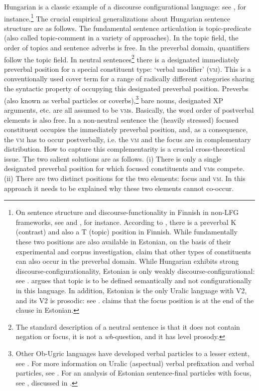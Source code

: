 \documentclass[output=paper,hidelinks]{langscibook}
\begin{document}
\newpage
Hungarian is a classic example of a discourse configurational language: see \citet{Kiss1995}, for instance.\footnote{On sentence structure and discourse-functionality in Finnish in non-LFG frameworks, see \citet{Vilkuna1995} and \citet{Brattico2019}, for instance. According to \citet{Vilkuna1995}, there is a preverbal K (contrast) and also a T (topic) position in Finnish. While fundamentally these two positions are also available in Estonian, on the basis of their experimental and corpus investigation, \citet{SahkaiTamm2018a,SahkaiTamm2019} claim that other types of constituents can also occur in the preverbal domain. While Hungarian exhibits strong discourse-configurationality, Estonian is only weakly discourse-configurational: see \citet[416--417]{SahkaiTamm2018a}. \citet{Hiietam2003} argues that topic is to be defined semantically and not configurationally in this language. In addition, Estonian is the only Uralic language with V2, and its V2 is prosodic: see \citet{SahkaiTamm2018b}. \citet{Tael1988} claims that the focus position is at the end of the clause in Estonian.} The crucial empirical generalizations about Hungarian sentence structure are as follows. The fundamental sentence articulation is topic-predicate (also called topic-comment in a variety of approaches). In the topic field, the order of topics and sentence adverbs is free. In the preverbal domain, quantifiers follow the topic field. In neutral sentences\footnote{The standard description of a neutral sentence is that it does not contain negation or focus, it is not a \textit{wh}-question, and it has level prosody.} there is a designated immediately preverbal position for a special constituent type: `verbal modifier' (\textsc{vm}). This is a conventionally used cover term for a range of radically different categories sharing the syntactic property of occupying this designated preverbal position. Preverbs (also known as verbal particles or coverbs),\footnote{Other Ob-Ugric languages have developed verbal particles to a lesser extent, see \citet{Zsirai1933}. For more information on Uralic (aspectual) verbal prefixation and verbal particles, see \citet{KieferHonti2003}. For an analysis of Estonian sentence-final particles with focus, see \citet[224--242]{Tamm2004a}, discussed in .} bare nouns, designated XP arguments, etc. are all assumed to be \textsc{vm}s. Basically, the word order of postverbal elements is also free. In a non-neutral sentence the (heavily stressed) focused constituent occupies the immediately preverbal position, and, as a consequence, the \textsc{vm} has to occur postverbally, i.e. the \textsc{vm} and the focus are in complementary distribution. How to capture this complementarity is a crucial cross-theoretical issue. The two salient solutions are as follows. (i) There is only a single designated preverbal position for which focused constituents and \textsc{vm}s compete. (ii) There are two distinct positions for the two elements: focus and \textsc{vm}. In this approach it needs to be explained why these two elements cannot co-occur.
\end{document}
